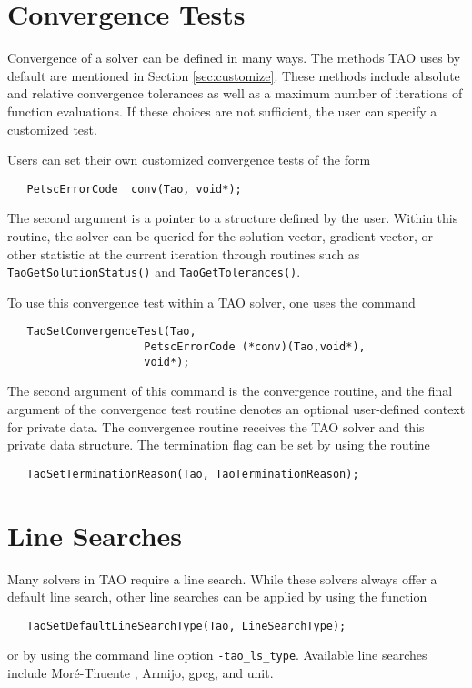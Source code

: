 \section{Convergence Tests}
\label{sec:Taoconvergence}

Convergence of a solver can be defined in many ways.
The methods TAO uses by default are mentioned in 
Section \ref{sec:customize}.
These methods include absolute and relative convergence tolerances as well
as a maximum number of iterations of function evaluations.
If these choices are not sufficient, 
the user can specify a customized test. 

Users can set their own customized convergence tests of the form
\begin{verbatim}
   PetscErrorCode  conv(Tao, void*);
\end{verbatim}
\noindent
The second argument is a pointer to a structure defined by the user.
Within this routine, the solver
can be queried for the solution vector, gradient vector,
or other statistic at the current iteration through routines such as
{\tt TaoGetSolutionStatus()} and  {\tt TaoGetTolerances()}.

To use this convergence test within a TAO solver, one uses
the command 
\begin{verbatim}
   TaoSetConvergenceTest(Tao,
                     PetscErrorCode (*conv)(Tao,void*),
                     void*);
\end{verbatim}
\noindent
The second argument of this command is the convergence routine, and the
final argument of the convergence test routine denotes an optional 
user-defined context for private data.  
The convergence routine receives the TAO solver and this private data
structure. 
The termination flag can be set by using the routine
\begin{verbatim}
   TaoSetTerminationReason(Tao, TaoTerminationReason);
\end{verbatim}
\noindent



\section{Line Searches} 
\label{sec:TaoLineSearch}

Many solvers in TAO require a line search.  While these solvers always
offer a default line search, other line searches can be applied by
using the function
\begin{verbatim}
   TaoSetDefaultLineSearchType(Tao, LineSearchType);
\end{verbatim}
or by using the command line option  {\tt -tao\_ls\_type}.  
Available line searches 
include Mor\'{e}-Thuente \cite{more:92}, Armijo, gpcg, and unit.

